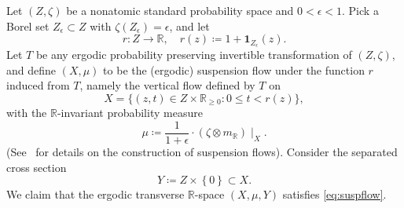 \documentclass{amsart}
\numberwithin{equation}{subsection}
\theoremstyle{remark}
\begin{document}
Let \(\left(Z,\zeta\right)\) be a nonatomic standard probability space and \(0<\epsilon<1\). Pick a Borel set \(Z_{\epsilon}\subset Z\) with \(\zeta\left(Z_{\epsilon}\right)=\epsilon\), and let
\[r:Z\to\mathbb{R},\quad r\left(z\right)\coloneqq 1+\mathbf{1}_{Z_{\epsilon}}\left(z\right).\]
Let \(T\) be any ergodic probability preserving invertible transformation of \(\left(Z,\zeta\right)\), and define \(\left(X,\mu\right)\) to be the (ergodic) suspension flow under the function \(r\) induced from \(T\), namely the vertical flow defined by \(T\) on
\[X=\{\left(z,t\right)\in Z\times\mathbb{R}_{\geq 0}:0\leq t<r\left(z\right)\},\]
with the \(\mathbb{R}\)-invariant probability measure
\[\mu\coloneqq\frac{1}{1+\epsilon}\cdot\left(\zeta\otimes m_{\mathbb{R}}\right)\mid_{X}.\]
(See~\cite[Ch.~11]{cornfeld2012ergodic} for details on the construction of suspension flows). Consider the separated cross section
\[Y\coloneqq Z\times\left\{0\right\}\subset X.\]
We claim that the ergodic transverse \(\mathbb{R}\)-space \(\left(X,\mu,Y\right)\) satisfies \eqref{eq:suspflow}. 

\bigskip
\end{document}
